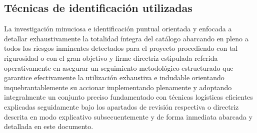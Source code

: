 \documentclass[11pt,spanish]{article}
\begin{document}
\subsection{Técnicas de identificación utilizadas}

La investigación minuciosa e identificación puntual orientada y enfocada a detallar exhaustivamente la totalidad íntegra del catálogo abarcando en pleno a todos los riesgos inminentes detectados para el proyecto procediendo con tal rigurosidad o con el gran objetivo y firme directriz estipulada referida operativamente en asegurar un seguimiento metodológico estructurado que garantice efectivamente la utilización exhaustiva e indudable orientando inquebrantablemente su accionar implementando plenamente y adoptando integralmente un conjunto preciso fundamentado con técnicas logísticas eficientes explicadas seguidamente bajo los apartados de revisión respectiva o directriz descrita en modo explicativo subsecuentemente y de forma inmediata abarcada y detallada en este documento.
\end{document}
